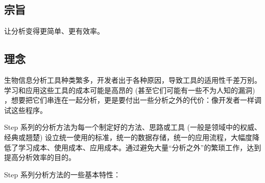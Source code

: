 \documentclass[
]{article}
\begin{document}
\hypertarget{ux5b97ux65e8}{%
\subsection{宗旨}\label{ux5b97ux65e8}}

让分析变得更简单、更有效率。

\hypertarget{ux7406ux5ff5}{%
\subsection{理念}\label{ux7406ux5ff5}}

生物信息分析工具种类繁多，开发者出于各种原因，导致工具的适用性千差万别。学习和应用这些工具的成本可能是高昂的 (甚至它们可能有一些不为人知的漏洞) ，想要把它们串连在一起分析，更是要付出一些分析之外的代价：像开发者一样调试这些程序。

Step 系列的分析方法为每一个制定好的方法、思路或工具 (一般是领域中的权威、经典或翘楚) 设立统一使用的标准，统一的数据存储，统一的应用流程，大幅度降低了学习成本、使用成本、应用成本。通过避免大量``分析之外''的繁琐工作，达到提高分析效率的目的。

Step 系列分析方法的一些基本特性：
\end{document}
